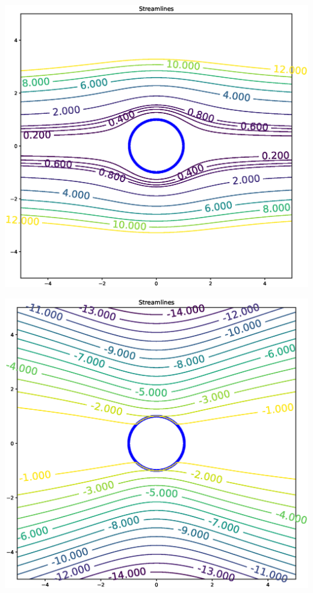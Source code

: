 \includegraphics[width=0.8\linewidth]{figures/creeping_flow_past_sphere}

\includegraphics[width=0.8\linewidth]{figures/creeping_flow_past_sphere_moving}

